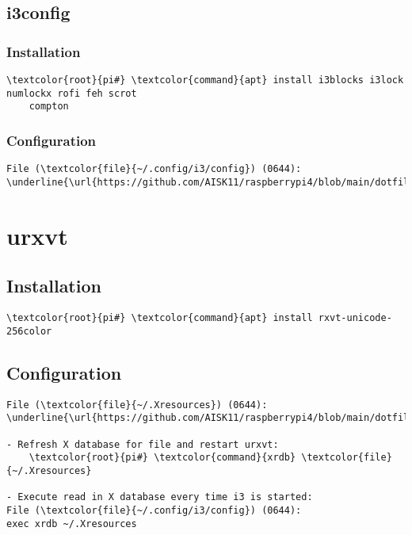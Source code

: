 \documentclass[10pt, a4paper, onecolumn, openany]{book} %
\begin{document}
\subsection{i3config}
\subsubsection{Installation}
\begin{Verbatim}[commandchars=\\\{\}]
    \textcolor{root}{pi#} \textcolor{command}{apt} install i3blocks i3lock numlockx rofi feh scrot
    compton
\end{Verbatim}
\subsubsection{Configuration}
\begin{Verbatim}[commandchars=\\\{\}]   
File (\textcolor{file}{~/.config/i3/config}) (0644):
\underline{\url{https://github.com/AISK11/raspberrypi4/blob/main/dotfiles/.config/i3/config}}
\end{Verbatim}

\section{urxvt}
\subsection{Installation}
\begin{Verbatim}[commandchars=\\\{\}]
    \textcolor{root}{pi#} \textcolor{command}{apt} install rxvt-unicode-256color
\end{Verbatim}

\subsection{Configuration}
\begin{Verbatim}[commandchars=\\\{\}]
File (\textcolor{file}{~/.Xresources}) (0644):
\underline{\url{https://github.com/AISK11/raspberrypi4/blob/main/dotfiles/.Xresources}}

- Refresh X database for file and restart urxvt:
    \textcolor{root}{pi#} \textcolor{command}{xrdb} \textcolor{file}{~/.Xresources}

- Execute read in X database every time i3 is started:
File (\textcolor{file}{~/.config/i3/config}) (0644):
exec xrdb ~/.Xresources    
\end{Verbatim}
\end{document}
